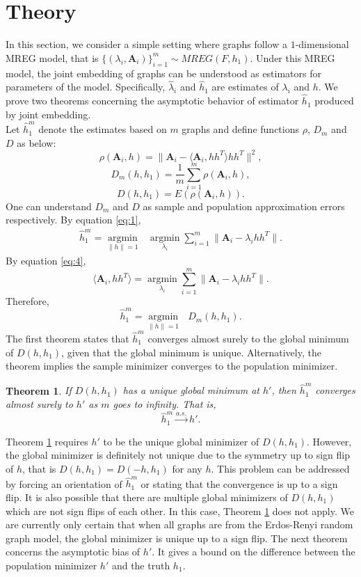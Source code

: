 \documentclass[10pt,journal,compsoc]{IEEEtran}
\newtheorem{theorem}{Theorem}[section]
\newcommand{\bA}{\mathbf{A}}
\begin{document}
\section{Theory}
In this section, we consider a simple setting where graphs follow a $1$-dimensional MREG model, that is $\{(\lambda_i,\bA_i)\} _{i=1}^m \sim MREG(F,h_1)$. Under this MREG model, the joint embedding of graphs can be understood as estimators for parameters of the model. Specifically, $\hat{\lambda}_i$ and $\hat{h}_1$ are estimates of $\lambda_i$ and $h$. We prove two theorems concerning the asymptotic behavior of estimator $\hat{h}_1$ produced by joint embedding. \\

\noindent Let $\hat{h}_1^m$ denote the estimates based on $m$ graphs and define functions $\rho$, $D_m$ and $D$ as below: 
\[ \rho(\bA_i,h)= \|\bA_i- \langle \bA_i,h h^T \rangle h h^T\|^2, \]
\[ D_m(h,h_1) =\frac{1}{m}\sum_{i=1}^{m} \rho(\bA_i,h), \]
\[ D(h,h_1) = E(\rho(\bA_i,h)). \]
One can understand $D_m$ and $D$ as sample and population  approximation errors respectively. By equation \eqref{eq:1},
\begin{align*} 
\hat{h}_1^m = \underset{\|h\| =1}{\operatorname{argmin}} \text{ }   \underset{\lambda_i}{\operatorname{argmin}} \sum_{i=1}^{m} \|\bA_i - \lambda_i h h^T\|.
\end{align*}
By equation \eqref{eq:4}, 
\[\langle \bA_i,hh^T \rangle=\underset{\lambda_i}{\operatorname{argmin}} \sum_{i=1}^{m} \|\bA_i - \lambda_i h h^T\|.\]
Therefore,
\[\hat{h}_1^m = \underset{\|h\| =1}{\operatorname{argmin}} \text{ } D_m(h,h_1). \]
The first theorem states that $\hat{h}_1^m$  converges almost surely to the global minimum of $D(h,h_1)$, given that the global minimum is unique. Alternatively, the theorem implies the sample minimizer converges to the population minimizer.
\begin{theorem}
\label{thm:1}
If $D(h,h_1)$ has a unique global minimum at $h'$, then $\hat{h}_1^m$ converges almost surely to $h'$ as $m$ goes to infinity. That is, 
\[ \hat{h}_1^m \overset{a.s.}{\rightarrow} h'. \]
\end{theorem}

\noindent Theorem \ref{thm:1} requires $h'$ to be the unique global minimizer of $D(h,h_1)$. However, the global minimizer is definitely not unique due to the symmetry up to sign flip of $h$, that is $D(h,h_1)=D(-h,h_1)$ for any $h$. This problem can be addressed by forcing an orientation of $\hat{h}_1^m$ or stating that the convergence is up to a sign flip. It is also possible that there are multiple global minimizers of $D(h,h_1)$ which are not sign flips of each other. In this case, Theorem \ref{thm:1} does not apply. We are currently only certain that when all graphs are from the Erdos-Renyi random graph model, the global minimizer is unique up to a sign flip. The next theorem concerns the asymptotic bias of $h'$. It gives a bound on the difference between the population minimizer  $h'$ and the truth $h_1$.
\end{document}
